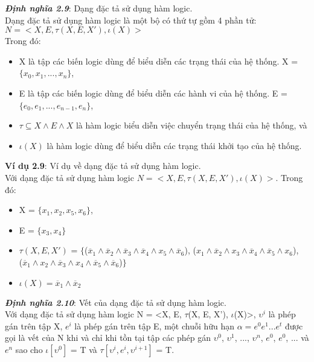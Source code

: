 \documentclass[a4paper,13pt,oneside,openany]{book}
\begin{document}
\begin{flushleft}
		\textbf{\textit{Định nghĩa 2.9}}: Dạng đặc tả sử dụng hàm logic.\\
		Dạng đặc tả sử dụng hàm logic là một bộ có thứ tự gồm 4 phần tử:\\
		$N = <X, E, \tau(X, E, X'), \iota(X)>$\\
		Trong đó:\\
		\begin{itemize}
			\item X là tập các biến logic dùng để biểu diễn các trạng thái của hệ thống. X = $\{x_0, x_1, ..., x_n\}$,
			\item E là tập các biến logic dùng để biểu diễn các hành vi của hệ thống. E = $\{e_0, e_1, ..., e_{n-1}, e_n\}$,
			\item $\tau \subseteq X \land E \land X$ là hàm logic biểu diễn việc chuyển trạng thái của hệ thống, và
			\item $\iota(X)$ là hàm logic dùng để biểu diễn các trạng thái khởi tạo của hệ thống.
		\end{itemize}
		\textbf{Ví dụ 2.9}: Ví dụ về dạng đặc tả sử dụng hàm logic.\\
		Với dạng đặc tả sử dụng hàm logic $N = <X, E, \tau(X, E, X'), \iota(X)>$. Trong đó:\\
		\begin{itemize}
			\item X = $\{x_1, x_2, x_5, x_6\}$,
			\item E = $\{x_3, x_4\}$
			\item $\tau(X, E, X')$ = $\{$($\overline{x}_1 \land \overline{x}_2 \land \overline{x}_3 \land \overline{x}_4 \land x_5 \land \overline{x}_6$), ($x_1\land\overline{x}_2\land x_3\land \overline{x}_4\land \overline{x}_5 \land x_6$),\\
			($\overline{x}_1\land x_2\land\overline{x}_3\land x_4\land \overline{x}_5\land\overline{x}_6$)$\}$
			\item $\iota(X) = \overline{x}_1 \land \overline{x}_2$
		\end{itemize}
		\textbf{\textit{Định nghĩa 2.10}}: Vết của dạng đặc tả sử dụng hàm logic.\\
		Với dạng đặc tả sử dụng hàm logic N = <X, E, $\tau$(X, E, X'), $\iota$(X)>, $\upsilon^i$ là phép gán trên tập X, $e^i$ là phép gán trên tập E, một chuỗi hữu hạn $\alpha = e^0e^1...e^t$ được gọi là vết của N khi và chỉ khi tồn tại tập các phép gán $\upsilon^0$, $\upsilon^1$, ..., $\upsilon^n$, $e^0$, $e^0$, ... và $e^n$ sao cho $\iota[\upsilon^0]$ = T và $\tau[\upsilon^i, e^i, \upsilon^{i+1}]$ = T.\\

\end{flushleft}
\end{document}
